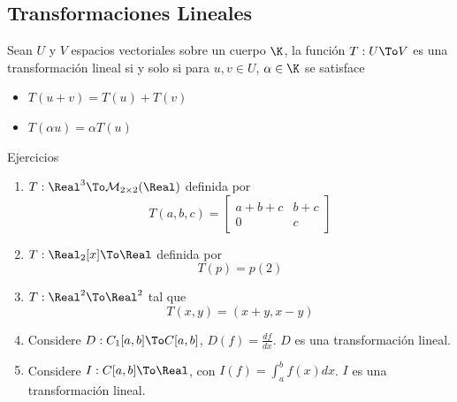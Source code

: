\subsection{Transformaciones Lineales}
\begin{frame}
\subsectionpage
\end{frame}


\begin{frame}
\begin{defn}
Sean $U$ y $V$ espacios vectoriales sobre un cuerpo $\K$, la función $T:U\To V$ es una transformación lineal si y solo si para $u,v\in U$, $\alpha\in\K$ se satisface
\begin{itemize}
\item $T(u+v)=T(u)+T(v)$
\item $T(\alpha u)=\alpha T(u)$
\end{itemize}
\end{defn}
\end{frame}

\begin{frame}{Ejercicios}
\begin{enumerate}
\item  $T:\Real^3\To \mathcal{M}_{2\times 2}(\Real)$ definida por $$T(a,b,c)=\left[\begin{array}{rr}a+b+c&b+c\\0&c\end{array}\right]$$
\item $T:\Real_2[x]\To\Real$ definida por $$T(p)=p(2)$$
\item $T:\Real^2\To\Real^2$ tal que $$T(x,y)=(x+y,x-y)$$
\item Considere $D:C_1[a,b]\To C[a,b]$, $D(f)=\frac{df}{dx}$. $D$ es una transformación lineal.\\
\item Considere $I:C[a,b]\To\Real$, con $I(f)=\int_a^b f(x)dx$. $I$ es una transformación lineal.\\
\end{enumerate}
\end{frame}

